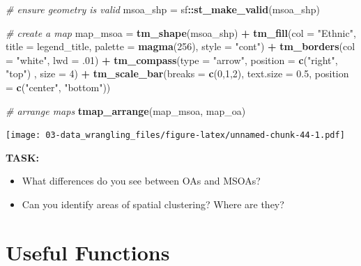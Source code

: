 \documentclass[
]{book}
\newenvironment{Shaded}{\begin{snugshade}}{\end{snugshade}}
\newcommand{\CommentTok}[1]{\textcolor[rgb]{0.56,0.35,0.01}{\textit{#1}}}
\newcommand{\DataTypeTok}[1]{\textcolor[rgb]{0.13,0.29,0.53}{#1}}
\newcommand{\DecValTok}[1]{\textcolor[rgb]{0.00,0.00,0.81}{#1}}
\newcommand{\FloatTok}[1]{\textcolor[rgb]{0.00,0.00,0.81}{#1}}
\newcommand{\KeywordTok}[1]{\textcolor[rgb]{0.13,0.29,0.53}{\textbf{#1}}}
\newcommand{\NormalTok}[1]{#1}
\newcommand{\OperatorTok}[1]{\textcolor[rgb]{0.81,0.36,0.00}{\textbf{#1}}}
\newcommand{\StringTok}[1]{\textcolor[rgb]{0.31,0.60,0.02}{#1}}
\providecommand{\tightlist}{%
  \setlength{\itemsep}{0pt}\setlength{\parskip}{0pt}}
\begin{document}
\begin{Shaded}
\begin{Highlighting}[]
\CommentTok{# ensure geometry is valid}
\NormalTok{msoa_shp =}\StringTok{ }\NormalTok{sf}\OperatorTok{::}\KeywordTok{st_make_valid}\NormalTok{(msoa_shp)}

\CommentTok{# create a map}
\NormalTok{map_msoa =}\StringTok{ }\KeywordTok{tm_shape}\NormalTok{(msoa_shp) }\OperatorTok{+}
\StringTok{  }\KeywordTok{tm_fill}\NormalTok{(}\DataTypeTok{col =} \StringTok{"Ethnic"}\NormalTok{, }\DataTypeTok{title =}\NormalTok{ legend_title, }\DataTypeTok{palette =} \KeywordTok{magma}\NormalTok{(}\DecValTok{256}\NormalTok{), }\DataTypeTok{style =} \StringTok{"cont"}\NormalTok{) }\OperatorTok{+}\StringTok{ }
\StringTok{  }\KeywordTok{tm_borders}\NormalTok{(}\DataTypeTok{col =} \StringTok{"white"}\NormalTok{, }\DataTypeTok{lwd =} \FloatTok{.01}\NormalTok{)  }\OperatorTok{+}\StringTok{ }
\StringTok{  }\KeywordTok{tm_compass}\NormalTok{(}\DataTypeTok{type =} \StringTok{"arrow"}\NormalTok{, }\DataTypeTok{position =} \KeywordTok{c}\NormalTok{(}\StringTok{"right"}\NormalTok{, }\StringTok{"top"}\NormalTok{) , }\DataTypeTok{size =} \DecValTok{4}\NormalTok{) }\OperatorTok{+}\StringTok{ }
\StringTok{  }\KeywordTok{tm_scale_bar}\NormalTok{(}\DataTypeTok{breaks =} \KeywordTok{c}\NormalTok{(}\DecValTok{0}\NormalTok{,}\DecValTok{1}\NormalTok{,}\DecValTok{2}\NormalTok{), }\DataTypeTok{text.size =} \FloatTok{0.5}\NormalTok{, }\DataTypeTok{position =}  \KeywordTok{c}\NormalTok{(}\StringTok{"center"}\NormalTok{, }\StringTok{"bottom"}\NormalTok{)) }

\CommentTok{# arrange maps }
\KeywordTok{tmap_arrange}\NormalTok{(map_msoa, map_oa) }
\end{Highlighting}
\end{Shaded}

\texttt{[image: 03-data\_wrangling\_files/figure-latex/unnamed-chunk-44-1.pdf]}

\textbf{TASK:}

\begin{itemize}
\tightlist
\item
  What differences do you see between OAs and MSOAs?
\item
  Can you identify areas of spatial clustering? Where are they?
\end{itemize}

\hypertarget{useful-functions}{%
\section{Useful Functions}\label{useful-functions}}
\end{document}
